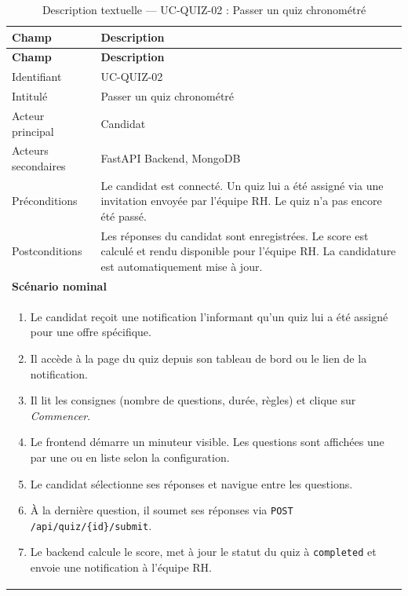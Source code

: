 \renewcommand{\arraystretch}{1.4}
\begin{longtable}{|p{4cm}|p{10cm}|}
\caption{Description textuelle — UC-QUIZ-02 : Passer un quiz chronométré}
\label{tab:uc_quiz02} \\
\hline
\rowcolor[HTML]{EFEFEF} \textbf{Champ} & \textbf{Description} \\ \hline
\endfirsthead
\hline
\rowcolor[HTML]{EFEFEF} \textbf{Champ} & \textbf{Description} \\ \hline
\endhead
\hline
\endfoot
\hline
\endlastfoot
Identifiant & UC-QUIZ-02 \\ \hline
Intitulé & Passer un quiz chronométré \\ \hline
Acteur principal & Candidat \\ \hline
Acteurs secondaires & FastAPI Backend, MongoDB \\ \hline
Préconditions & Le candidat est connecté. Un quiz lui a été assigné via une invitation envoyée par l'équipe RH. Le quiz n'a pas encore été passé. \\ \hline
Postconditions & Les réponses du candidat sont enregistrées. Le score est calculé et rendu disponible pour l'équipe RH. La candidature est automatiquement mise à jour. \\ \hline
\multicolumn{2}{|l|}{\textbf{Scénario nominal}} \\ \hline
\multicolumn{2}{|p{14.5cm}|}{
\vspace{2pt}
\begin{enumerate}
    \item Le candidat reçoit une notification l'informant qu'un quiz lui a été assigné pour une offre spécifique.
    \item Il accède à la page du quiz depuis son tableau de bord ou le lien de la notification.
    \item Il lit les consignes (nombre de questions, durée, règles) et clique sur \textit{Commencer}.
    \item Le frontend démarre un minuteur visible. Les questions sont affichées une par une ou en liste selon la configuration.
    \item Le candidat sélectionne ses réponses et navigue entre les questions.
    \item À la dernière question, il soumet ses réponses via \texttt{POST /api/quiz/\{id\}/submit}.
    \item Le backend calcule le score, met à jour le statut du quiz à \texttt{completed} et envoie une notification à l'équipe RH.
\end{enumerate}
}
\end{longtable}
